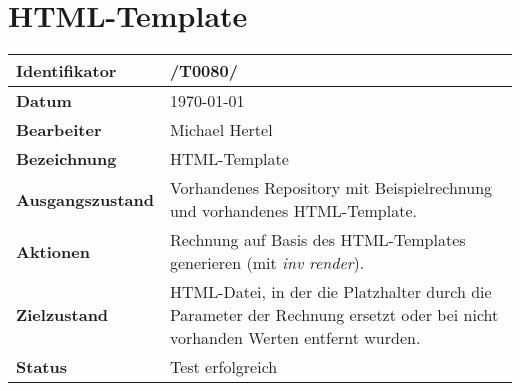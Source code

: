 
\section{HTML-Template}

\renewcommand{\arraystretch}{1.5}

\begin{center}
 \begin{tabular}{|p{}|p{}|}
	\hline
	\textbf{Identifikator}  & /T0080/ \\
	\hline
	\textbf{Datum} & \today \\
	\hline
	\textbf{Bearbeiter} & Michael Hertel \\
	\hline
	\textbf{Bezeichnung} & HTML-Template \\
	\hline
	\textbf{Ausgangszustand} & 
		Vorhandenes Repository mit Beispielrechnung und vorhandenes HTML-Template. \\
	\hline
	\textbf{Aktionen} & 
		Rechnung auf Basis des HTML-Templates generieren (mit \textit{inv render}). \\
	\hline
	\textbf{Zielzustand} & 
		HTML-Datei, in der die Platzhalter durch die Parameter der Rechnung ersetzt oder bei nicht vorhanden Werten entfernt wurden. \\
	\hline
	\textbf{Status} & Test erfolgreich \\
	\hline
 \end{tabular}
\end{center}

